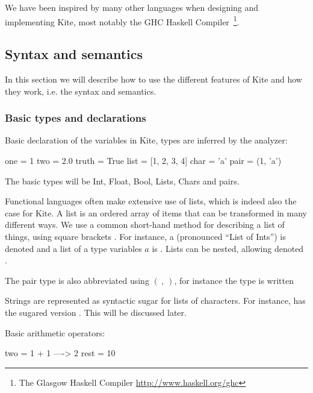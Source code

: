 
We have been inspired by many other languages when designing and implementing Kite, most notably the GHC Haskell Compiler~\footnote{The Glasgow Haskell Compiler \url{http://www.haskell.org/ghc}}.


\subsection{Syntax and semantics}
In this section we will describe how to use the different features of Kite and how they work, i.e. the syntax and semantics.

\subsubsection{Basic types and declarations}
Basic declaration of the variables in Kite, types are inferred by the analyzer:

\begin{kite}
one = 1
two = 2.0
truth = True
list = [1, 2, 3, 4]
char = 'a'
pair = (1, 'a')
\end{kite}

The basic types will be Int, Float, Bool, Lists, Chars and pairs.

Functional languages often make extensive use of lists, which is
indeed also the case for Kite. A list is an ordered array of items
that can be transformed in many different ways. We use a common
short-hand method for describing a list of things, using square
brackets \code{[\ ]}. For instance, a  (pronounced ``List of
Ints'') is denoted \code{[Int]} and a list of a type variables $a$ is
\code{[a]}. Lists can be nested, allowing  denoted \code{[[Int]]}.

The pair type is also abbreviated using $(\ ,\ )$, for instance the type  is written 

Strings are represented as syntactic sugar for lists of characters. For
instance, \code{['f', 'o', 'o']} has the sugared version . This will be discussed later.

Basic arithmetic operators:
\begin{kite}
two = 1 + 1  ---->  2
rest = 10 %
\end{kite}

